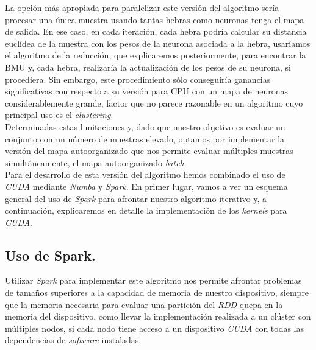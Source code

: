 La opción más apropiada para paralelizar este versión del algoritmo sería procesar una única muestra usando tantas hebras como neuronas tenga el mapa de salida. En ese caso, en cada iteración, cada hebra podría calcular su distancia euclídea de la muestra con los pesos de la neurona asociada a la hebra, usaríamos el algoritmo de la reducción, que explicaremos posteriormente, para encontrar la BMU y, cada hebra, realizaría la actualización de los pesos de su neurona, si procediera. Sin embargo, este procedimiento sólo conseguiría ganancias significativas con respecto a su versión para CPU con un mapa de neuronas considerablemente grande, factor que no parece razonable en un algoritmo cuyo principal uso es el \textit{clustering}.\\

Determinadas estas limitaciones y, dado que nuestro objetivo es evaluar un conjunto con un número de muestras elevado, optamos por implementar la versión del mapa autoorganizado que nos permite evaluar múltiples muestras simultáneamente, el mapa autoorganizado \textit{batch}.\\


Para el desarrollo de esta versión del algoritmo hemos combinado el uso de \textit{CUDA} mediante \textit{Numba} y \textit{Spark}. En primer lugar, vamos a ver un esquema general del uso de \textit{Spark} para afrontar nuestro algoritmo iterativo y, a continuación, explicaremos en detalle la implementación de los \textit{kernels} para \textit{CUDA}.

\subsection{Uso de Spark.}
Utilizar \textit{Spark} para implementar este algoritmo nos permite afrontar problemas de tamaños superiores a la capacidad de memoria de nuestro dispositivo, siempre que la memoria necesaria para evaluar una partición del \textit{RDD} quepa en la memoria del dispositivo, como llevar la implementación realizada a un clúster con múltiples nodos, si cada nodo tiene acceso a un dispositivo \textit{CUDA} con todas las dependencias de \textit{software} instaladas.\\

